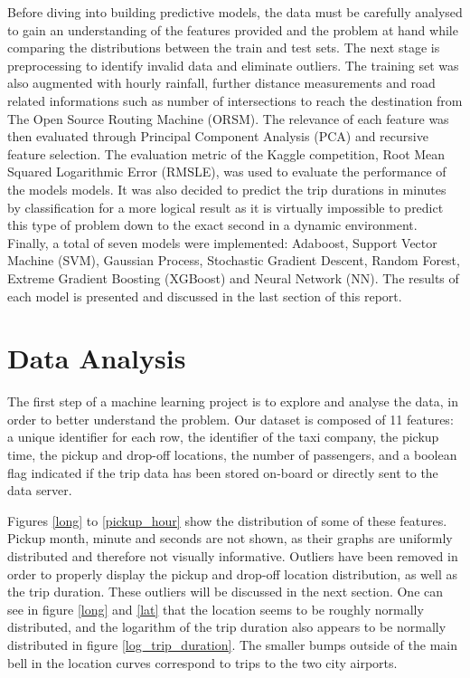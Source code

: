 \documentclass[a4paper]{article}
\begin{document}
Before diving into building predictive models, the data must be carefully
analysed to gain an understanding of the features provided and the problem at
hand while comparing the distributions between the train and test sets. The next
stage is preprocessing to identify invalid data and eliminate outliers. The
training set was also augmented with hourly rainfall, further distance
measurements and road related informations such as number of intersections to
reach the destination from The Open Source Routing Machine (ORSM). The relevance
of each feature was then evaluated through Principal Component Analysis (PCA)
and recursive feature selection. The evaluation metric of the Kaggle
competition, Root Mean Squared Logarithmic Error (RMSLE), was used to evaluate
the performance of the models models. It was also decided to predict the trip
durations in minutes by classification for a more logical result as it is
virtually impossible to predict this type of problem down to the exact second in
a dynamic environment. Finally, a total of seven models were implemented:
Adaboost, Support Vector Machine (SVM), Gaussian Process, Stochastic Gradient
Descent, Random Forest, Extreme Gradient Boosting (XGBoost) and Neural Network
(NN). The results of each model is presented and discussed in the last section
of this report.

\section{Data Analysis}
The first step of a machine learning project is to explore and analyse the data,
in order to better understand the problem. Our dataset is composed of 11
features: a unique identifier for each row, the identifier of the taxi company,
the pickup time, the pickup and drop-off locations, the number of passengers,
and a boolean flag indicated if the trip data has been stored on-board or
directly sent to the data server.

Figures \ref{long} to \ref{pickup_hour} show the distribution of some of these
features. Pickup month, minute and seconds are not shown, as their graphs
are uniformly distributed and therefore not visually informative. Outliers have
been removed in order to properly display the pickup and drop-off location
distribution, as well as the trip duration. These outliers will be discussed in
the next section. One can see in figure \ref{long} and \ref{lat} that the
location seems to be roughly normally distributed, and the logarithm of the trip
duration also appears to be normally distributed in figure
\ref{log_trip_duration}. The smaller bumps outside of the main bell in the
location curves correspond to trips to the two city airports.
\end{document}
